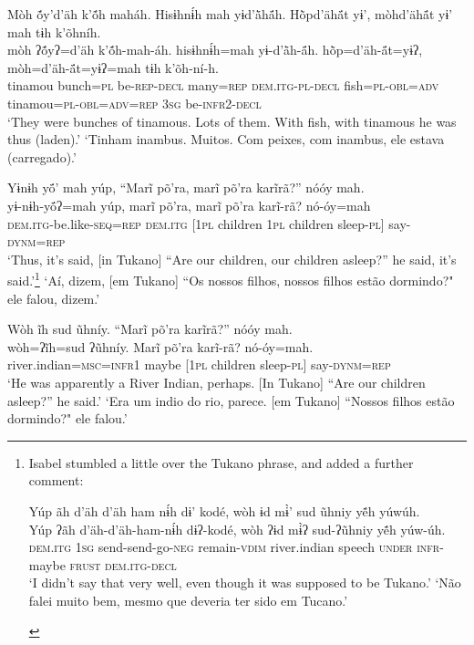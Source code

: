 \documentclass[output=paper,
modfonts,nonflat
]{langsci/langscibook}
\begin{document}
\ea Mòh ṍy’d’äh  k’ṍh maháh.  Hisɨhnɨ́h mah yɨd’ä̀hä́h.  Hõ̀pd’ähä́t yɨ’, mòhd’ähä́t yɨ’ mah tɨh k’õhníh.\\ 
\gll mòh ʔṍyʔ=d’äh  k’ṍh-mah-áh.  hisɨhnɨ́h=mah yɨ-d’ä̀h-ä́h.  hõ̀p=d’äh-ä́t=yɨʔ, mòh=d’äh-ä́t=yɨʔ=mah tɨh k’õh-ní-h.\\
     tinamou bunch\textsc{=pl} be\textsc{-rep-decl} many\textsc{=rep} \textsc{dem.itg-pl-decl} fish\textsc{=pl-obl=adv} tinamou\textsc{=pl-obl=adv=rep} \textsc{3sg} be\textsc{-infr2-decl}\\
\glt ‘They were bunches of tinamous.{\footnotemark} Lots of them. With fish, with tinamous he was thus (laden).'
\glt ‘Tinham inambus. Muitos. Com peixes, com inambus, ele estava (carregado).'
\z 

\newpage
\ea  Yɨnɨh yö́’ mah yúp, “Marĩ põ’ra, marĩ põ’ra karĩrã?” nóóy mah.\\ 
\gll yɨ-nɨh-yö́ʔ=mah yúp, marĩ põ’ra, marĩ põ’ra karĩ-rã? nó-óy=mah\\
     \textsc{dem.itg-}be.like\textsc{-seq=rep} \textsc{dem.itg} [\textsc{1pl} children \textsc{1pl} children sleep\textsc{-pl}] say\textsc{-dynm=rep}\\
\glt ‘Thus, it’s said, [in Tukano] “Are our children, our children asleep?” he said, it’s said.'\footnote{Isabel stumbled a little over the Tukano phrase, and added a further comment:\\ 
\begin{exe}
\ex Yúp ãh d’äh d’äh ham nɨ́h dɨ’ kodé, wòh ɨd mɨ̀’ sud ũhniy yẽ́h yúwúh.\\
\gll Yúp ʔãh d’äh-d’äh-ham-nɨ́h dɨʔ-kodé, wòh ʔɨd mɨ̀ʔ sud-ʔũhniy yẽ́h yúw-úh.\\
\textsc{dem.itg} \textsc{1sg} send-send-go-\textsc{neg} remain-\textsc{vdim} river.indian speech \textsc{under} \textsc{infr}-maybe \textsc{frust} \textsc{dem.itg-decl}\\
\glt ‘I didn’t say that very well, even though it was supposed to be Tukano.’
\glt ‘Não falei muito bem, mesmo que deveria ter sido em Tucano.’
\end{exe}}
\glt ‘Aí, dizem, [em Tukano] “Os nossos filhos, nossos filhos estão dormindo?" ele falou, dizem.' 
\z 

\ea  Wòh ĩh sud ũhníy.  “Marĩ põ’ra karĩrã?” nóóy mah.\\ 
\gll wòh=ʔĩh=sud ʔũhníy. Marĩ põ’ra karĩ-rã? nó-óy=mah.\\
     river.indian\textsc{=msc=infr1} maybe [\textsc{1pl} children sleep\textsc{-pl}] say\textsc{-dynm=rep}\\
\glt ‘He was apparently a River Indian, perhaps.{\footnotemark} [In Tukano] “Are our children asleep?” he said.'
\glt ‘Era um indio do rio, parece. [em Tukano] “Nossos filhos estão dormindo?" ele falou.'
\z 
\end{document}
